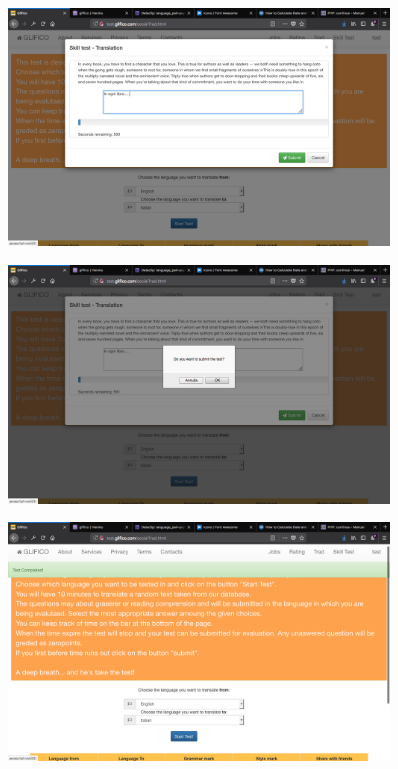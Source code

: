\documentclass[11 pt, a4paper]{article}
\begin{document}
\clearpage
\begin{figure}[H]
\centering
\includegraphics[width=0.9\textwidth]{translator_socialtrad6.png}
\end{figure}


\begin{figure}[H]
\centering
\includegraphics[width=0.9\textwidth]{translator_socialtrad7.png}
\end{figure}


\clearpage
\begin{figure}[H]
\centering
\includegraphics[width=0.9\textwidth]{translator_socialtrad8.png}
\end{figure}
\end{document}
